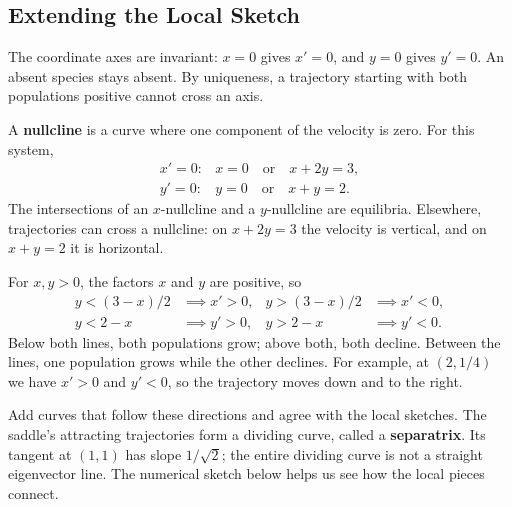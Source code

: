 \documentclass[10pt,letterpaper]{article}
\begin{document}
\subsection{Extending the Local Sketch}
The coordinate axes are invariant: $x=0$ gives $x'=0$, and $y=0$
gives $y'=0$. An absent species stays absent. By uniqueness, a trajectory
starting with both populations positive cannot cross an axis.

A \textbf{nullcline} is a curve where one component of the velocity is zero.
For this system,
\[
\begin{array}{ll}
x'=0:&x=0\quad\text{or}\quad x+2y=3,\\
y'=0:&y=0\quad\text{or}\quad x+y=2.
\end{array}
\]
The intersections of an $x$-nullcline and a $y$-nullcline are equilibria.
Elsewhere, trajectories can cross a nullcline: on $x+2y=3$ the velocity
is vertical, and on $x+y=2$ it is horizontal.

For $x,y>0$, the factors $x$ and $y$ are positive, so
\[
\begin{aligned}
y<(3-x)/2&\implies x'>0,&y>(3-x)/2&\implies x'<0,\\
y<2-x&\implies y'>0,&y>2-x&\implies y'<0.
\end{aligned}
\]
Below both lines, both populations grow; above both, both decline.
Between the lines, one population grows while the other declines.
For example, at $(2,1/4)$ we have $x'>0$ and $y'<0$, so the trajectory
moves down and to the right.

Add curves that follow these directions and agree with the local
sketches. The saddle's attracting trajectories form a dividing curve,
called a \textbf{separatrix}. Its tangent at $(1,1)$ has slope
$1/\sqrt2$; the entire dividing curve is not a straight eigenvector line.
The numerical sketch below helps us see how the local pieces connect.
\end{document}
